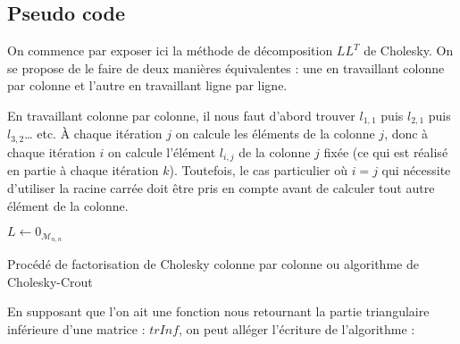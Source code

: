 \documentclass[a4paper, titlepage]{livret}													%
\begin{document}
		\subsection{Pseudo code}
			On commence par exposer ici la méthode de décomposition $LL^{T}$ de Cholesky. 
			On se propose de le faire de deux manières équivalentes : une en travaillant colonne par colonne et l'autre en travaillant ligne par ligne.

			En travaillant colonne par colonne, il nous faut d'abord trouver $l_{1,1}$ puis $l_{2,1}$ puis $l_{3,2}$… etc. À chaque itération $j$ on calcule les éléments de la colonne $j$, donc à chaque itération $i$ on calcule l'élément $l_{i,j}$ de la colonne $j$ fixée (ce qui est réalisé en partie à chaque itération $k$).
			Toutefois, le cas particulier où $i = j$ qui nécessite d'utiliser la racine carrée doit être pris en compte avant de calculer tout autre élément de la colonne.

			\begin{algorithm}[H]
				$L \gets 0_{\mathcal{M}_{n,n}}$ \\
				\caption{Procédé de factorisation de Cholesky colonne par colonne ou algorithme de Cholesky-Crout}
			\end{algorithm}

			En supposant que l'on ait une fonction nous retournant la partie triangulaire inférieure d'une matrice : $trInf$, on peut alléger l'écriture de l'algorithme :
\end{document}
